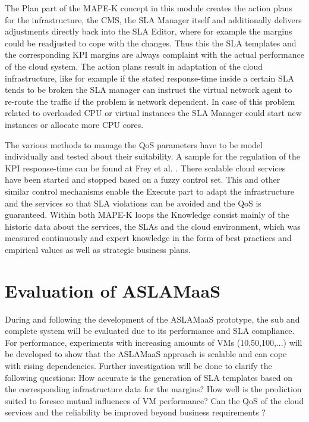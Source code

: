 The Plan part of the MAPE-K concept in this module creates the action plans for the infrastructure, the CMS, the SLA Manager itself and additionally delivers adjustments directly back into the SLA Editor, where for example the margins could be readjusted to cope with the changes. Thus this the SLA templates and the corresponding KPI margins are always complaint with the actual performance of the cloud system. The action plans result in adaptation of the cloud infrastructure, like for example if the stated response-time inside a certain SLA tends to be broken the SLA manager can instruct the virtual network agent to re-route the traffic if the problem is network dependent. In case of this problem related to overloaded CPU or virtual instances the SLA Manager could start new instances or allocate more CPU cores.

The various methods to manage the QoS parameters have to be model individually and tested about their suitability. A sample for the regulation of the KPI response-time can be found at Frey et al. \cite{Fuzzy}. There scalable cloud services have been started and stopped based on a fuzzy control set. This and other similar control mechanisms enable the Execute part to adapt the infrastructure and the services so that SLA violations can be avoided and the QoS is guaranteed. Within both MAPE-K loops the Knowledge consist mainly of the historic data about the services, the SLAs and the cloud environment, which was measured continuously and expert knowledge in the form of best practices and empirical values as well as strategic business plans. %

\section{Evaluation of ASLAMaaS}
During and following the development of the ASLAMaaS prototype, the sub and complete system will be evaluated due to its performance and SLA compliance. For performance, experiments with increasing amounts of VMs (10,50,100,...) will be developed to show that the ASLAMaaS approach is scalable and can cope with rising dependencies. Further investigation will be done to clarify the following questions: How accurate is the generation of SLA templates based on the corresponding infrastructure data for the margins? How well is the prediction suited to foresee mutual influences of VM performance?  Can the QoS of the cloud services and the reliability be improved beyond business requirements ?

